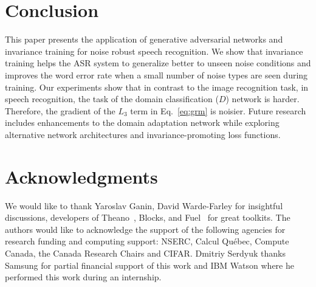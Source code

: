 \documentclass[a4paper]{article}
\begin{document}
\section{Conclusion}
\label{sec:discussion}
    This paper presents the application of generative adversarial networks and 
    invariance training for noise robust speech recognition. We show that invariance training 
    helps the ASR system to generalize better to unseen noise conditions and improves 
    the word error rate when a small number of noise types are seen during training. Our 
    experiments show that in contrast to the image recognition task, in speech 
    recognition, the task of the domain classification ($D$) network is harder. Therefore, the 
    gradient of the $L_3$ term in Eq.~\ref{eq:grm} is noisier. Future 
    research includes enhancements to the domain adaptation network while exploring 
    alternative network architectures and invariance-promoting loss functions.

\section{Acknowledgments}

We would like to thank Yaroslav Ganin, David Warde-Farley for insightful discussions,
developers of Theano~\citep{theano2016theano}, Blocks, and Fuel~\citep{MerrienboerBDSW15} 
for great toolkits. 
The authors would like to acknowledge the support of the following agencies for
research funding and computing support: NSERC, Calcul Qu\'{e}bec, Compute Canada,
the Canada Research Chairs and CIFAR. Dmitriy Serdyuk thanks Samsung for partial
financial support of this work and IBM Watson where he performed this work 
during an internship.




\end{document}
